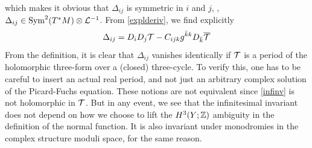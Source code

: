 which makes it obvious that $\Delta_{ij}$ is symmetric in $i$
and $j$, \ie, $\Delta_{ij}\in {\rm Sym}^2(T^*M)\otimes{\cal L}^{-1}$.
From \eqref{explderiv}, we find explicitly
\begin{equation}
\eqlabel{infinv}
\Delta_{ij} = D_iD_j\calt - C_{ijk} g^{\kb k} D_\kb \overline\calt
\end{equation}
From the definition, it is clear that $\Delta_{ij}$ vanishes 
identically if ${\cal T}$ is a period of the holomorphic three-form 
over a (closed) three-cycle. To verify this, one has to be careful to
insert an actual real period, and not just an arbitrary complex 
solution of the Picard-Fuchs equation. These notions are not 
equivalent since \eqref{infinv} is not holomorphic in ${\cal T}$.
But in any event, we see that the infinitesimal invariant does
not depend on how we choose to lift the $H^3(Y;{\mathbb Z})$ ambiguity
in the definition of the normal function. It is also invariant
under monodromies in the complex structure moduli space, for
the same reason.

